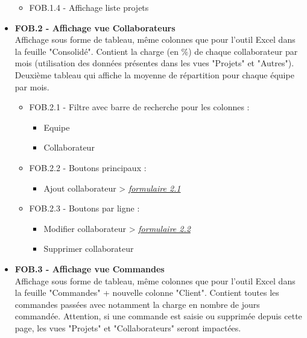 \documentclass[french]{report}
\begin{document}
\begin{itemize}[label=\textbullet, font=\normalfont \color{blue}]
\begin{itemize}[label=\textbullet]
    \item{FOB.1.4 - Affichage liste projets}

  \end{itemize}

  \item{\textbf{FOB.2 - Affichage vue Collaborateurs}}\\
Affichage sous forme de tableau, même colonnes que pour l’outil Excel dans la
feuille "Consolidé". Contient la charge (en \%) de chaque collaborateur par mois
(utilisation des données présentes dans les vues "Projets" et "Autres"). Deuxième
tableau qui affiche la moyenne de répartition pour chaque équipe par mois.

  \begin{itemize}[label=\textbullet]
    \item{FOB.2.1 - Filtre avec barre de recherche pour les colonnes :}

    \begin{itemize}[label=-]
      \item{Equipe}
      \item{Collaborateur}
    \end{itemize}

    \item{FOB.2.2 - Boutons principaux :}

    \begin{itemize}[label=-]
      \item{Ajout collaborateur} > \hyperref[sec:2.1]{\emph{formulaire 2.1}}
    \end{itemize}

    \item{FOB.2.3 - Boutons par ligne :}

    \begin{itemize}[label=-]
      \item{Modifier collaborateur} > \hyperref[sec:2.2]{\emph{formulaire 2.2}}
      \item{Supprimer collaborateur}
    \end{itemize}

  \end{itemize}

  \item{\textbf{FOB.3 - Affichage vue Commandes}}\\
Affichage sous forme de tableau, même colonnes que pour l’outil Excel dans la
feuille "Commandes" + nouvelle colonne "Client". Contient toutes les commandes
passées avec notamment la charge en nombre de jours commandée. Attention, si
une commande est saisie ou supprimée depuis cette page, les vues "Projets" et
"Collaborateurs" seront impactées.


\end{itemize}
\end{document}
